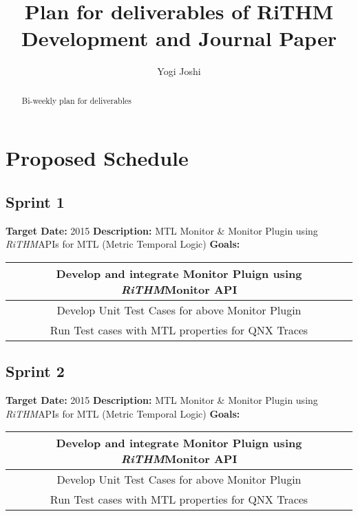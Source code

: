 \documentclass[]{article}
\title{ Plan for deliverables of \textbf{RiTHM} Development and Journal Paper}
\author{Yogi Joshi}
\newcommand{\rithm}{\textit{RiTHM}}
\begin{document}
\maketitle

\begin{abstract}
Bi-weekly plan for deliverables
\end{abstract}
\section{Proposed Schedule}
\subsection{Sprint 1}
\textbf{Target Date:}\space {} {2015}\newline
\textbf{Description:} MTL Monitor \& Monitor Plugin using \rithm APIs for MTL (Metric Temporal Logic)\newline
\textbf{Goals:}\newline
\begin{tabular}{|c|}
\hline
Develop and integrate Monitor Pluign using \rithm Monitor API\\
\hline
Develop Unit Test Cases for above Monitor Plugin\\
\hline
Run Test cases with MTL properties for QNX Traces\\
\end{tabular}

\subsection{Sprint 2}
\textbf{Target Date:}\space {} {2015}\newline
\textbf{Description:} MTL Monitor \& Monitor Plugin using \rithm APIs for MTL (Metric Temporal Logic)\newline
\textbf{Goals:}\newline
\begin{tabular}{|c|}
\hline
Develop and integrate Monitor Pluign using \rithm Monitor API\\
\hline
Develop Unit Test Cases for above Monitor Plugin\\
\hline
Run Test cases with MTL properties for QNX Traces\\
\end{tabular}
\end{document}
